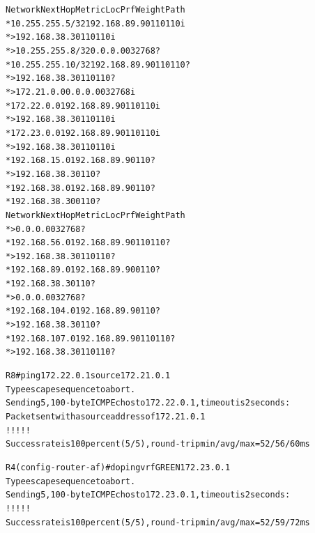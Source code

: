 \documentclass[12pt,twoside,a4paper]{report}
\begin{document}
{\begin{small}
\begin{alltt}
     Network          Next Hop            Metric LocPrf Weight Path
 *   10.255.255.5/32  192.168.89.9                           0 110 110 i
 *>                   192.168.38.3                           0 110 110 i
 *>  10.255.255.8/32  0.0.0.0                  0         32768 ?
 *   10.255.255.10/32 192.168.89.9                           0 110 110 ?
 *>                   192.168.38.3                           0 110 110 ?
 *>  172.21.0.0       0.0.0.0                  0         32768 i
 *   172.22.0.0       192.168.89.9                           0 110 110 i
 *>                   192.168.38.3                           0 110 110 i
 *   172.23.0.0       192.168.89.9                           0 110 110 i
 *>                   192.168.38.3                           0 110 110 i
 *   192.168.15.0     192.168.89.9                           0 110 ?
 *>                   192.168.38.3                           0 110 ?
 *   192.168.38.0     192.168.89.9                           0 110 ?
 *                    192.168.38.3             0             0 110 ?
     Network          Next Hop            Metric LocPrf Weight Path
 *>                   0.0.0.0                  0         32768 ?
 *   192.168.56.0     192.168.89.9                           0 110 110 ?
 *>                   192.168.38.3                           0 110 110 ?
 *   192.168.89.0     192.168.89.9             0             0 110 ?
 *                    192.168.38.3                           0 110 ?
 *>                   0.0.0.0                  0         32768 ?
 *   192.168.104.0    192.168.89.9                           0 110 ?
 *>                   192.168.38.3                           0 110 ?
 *   192.168.107.0    192.168.89.9                           0 110 110 ?
 *>                   192.168.38.3                           0 110 110 ?







R8#ping 172.22.0.1 source 172.21.0.1
Type escape sequence to abort.
Sending 5, 100-byte ICMP Echos to 172.22.0.1, timeout is 2 seconds:
Packet sent with a source address of 172.21.0.1 
!!!!!
Success rate is 100 percent (5/5), round-trip min/avg/max = 52/56/60 ms





R4(config-router-af)#do ping vrf GREEN 172.23.0.1
Type escape sequence to abort.
Sending 5, 100-byte ICMP Echos to 172.23.0.1, timeout is 2 seconds:
!!!!!
Success rate is 100 percent (5/5), round-trip min/avg/max = 52/59/72 ms

\end{alltt}
\end{small}
}
\end{document}
